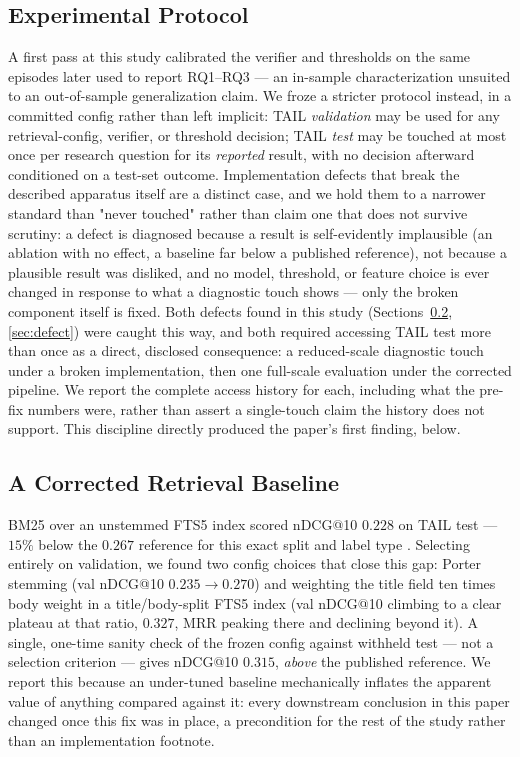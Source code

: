 \documentclass[conference]{IEEEtran}
\begin{document}
\subsection{Experimental Protocol}
\label{sec:protocol}

A first pass at this study calibrated the verifier and thresholds on
the same episodes later used to report RQ1--RQ3 --- an in-sample
characterization unsuited to an out-of-sample generalization claim. We
froze a stricter protocol instead, in a committed config rather than
left implicit: TAIL \emph{validation} may be used for any
retrieval-config, verifier, or threshold decision; TAIL \emph{test} may
be touched at most once per research question for its \emph{reported}
result, with no decision afterward conditioned on a test-set outcome.
Implementation defects that break the described apparatus itself are a
distinct case, and we hold them to a narrower standard than "never
touched" rather than claim one that does not survive scrutiny: a
defect is diagnosed because a result is self-evidently implausible (an
ablation with no effect, a baseline far below a published reference),
not because a plausible result was disliked, and no model, threshold,
or feature choice is ever changed in response to what a diagnostic
touch shows --- only the broken component itself is fixed. Both
defects found in this study (Sections~\ref{sec:bm25-fix},
\ref{sec:defect}) were caught this way, and both required accessing
TAIL test more than once as a direct, disclosed consequence: a
reduced-scale diagnostic touch under a broken implementation, then one
full-scale evaluation under the corrected pipeline. We report the
complete access history for each, including what the pre-fix numbers
were, rather than assert a single-touch claim the history does not
support. This discipline directly produced the paper's first finding,
below.

\subsection{A Corrected Retrieval Baseline}
\label{sec:bm25-fix}

BM25 over an unstemmed FTS5 index scored nDCG@10 $0.228$ on TAIL test
--- $15\%$ below the $0.267$ reference for this exact split and label
type \cite{tripclick-strong-baselines}. Selecting entirely on
validation, we found two config choices that close this gap: Porter
stemming (val nDCG@10 $0.235 \to 0.270$) and weighting the title field
ten times body weight in a title/body-split FTS5 index (val nDCG@10
climbing to a clear plateau at that ratio, $0.327$, MRR peaking there
and declining beyond it). A single, one-time sanity check of the frozen
config against withheld test --- not a selection criterion --- gives
nDCG@10 $0.315$, \emph{above} the published reference. We report this
because an under-tuned baseline mechanically inflates the apparent
value of anything compared against it: every downstream conclusion in
this paper changed once this fix was in place, a precondition for the
rest of the study rather than an implementation footnote.
\end{document}
